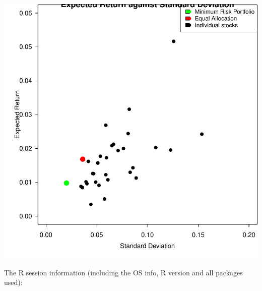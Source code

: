 \documentclass{article}\usepackage[]{graphicx}\usepackage[]{xcolor}
\newenvironment{knitrout}{}{} %
\begin{document}
\begin{knitrout}
{\centering \includegraphics[width=.6\linewidth]{figure/part1-Rnwauto-report-1} 

}


\end{knitrout}

The R session information (including the OS info, R version and all
packages used):
\end{document}
